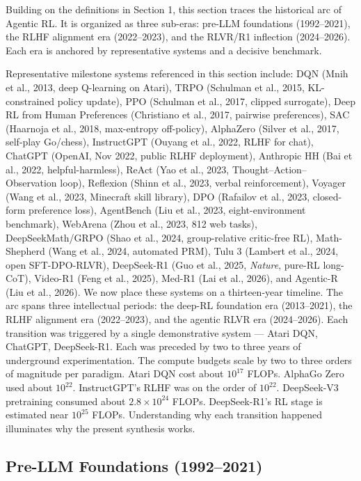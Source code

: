 Building on the definitions in Section 1, this section traces the historical arc of Agentic RL. It is organized as three sub-eras: pre-LLM foundations (1992--2021), the RLHF alignment era (2022--2023), and the RLVR/R1 inflection (2024--2026). Each era is anchored by representative systems and a decisive benchmark.

Representative milestone systems referenced in this section include: DQN (Mnih et al., 2013, deep Q-learning on Atari), TRPO (Schulman et al., 2015, KL-constrained policy update), PPO (Schulman et al., 2017, clipped surrogate), Deep RL from Human Preferences (Christiano et al., 2017, pairwise preferences), SAC (Haarnoja et al., 2018, max-entropy off-policy), AlphaZero (Silver et al., 2017, self-play Go/chess), InstructGPT (Ouyang et al., 2022, RLHF for chat), ChatGPT (OpenAI, Nov 2022, public RLHF deployment), Anthropic HH (Bai et al., 2022, helpful-harmless), ReAct (Yao et al., 2023, Thought--Action--Observation loop), Reflexion (Shinn et al., 2023, verbal reinforcement), Voyager (Wang et al., 2023, Minecraft skill library), DPO (Rafailov et al., 2023, closed-form preference loss), AgentBench (Liu et al., 2023, eight-environment benchmark), WebArena (Zhou et al., 2023, 812 web tasks), DeepSeekMath/GRPO (Shao et al., 2024, group-relative critic-free RL), Math-Shepherd (Wang et al., 2024, automated PRM), Tulu 3 (Lambert et al., 2024, open SFT-DPO-RLVR), DeepSeek-R1 (Guo et al., 2025, \emph{Nature}, pure-RL long-CoT), Video-R1 (Feng et al., 2025), Med-R1 (Lai et al., 2026), and Agentic-R (Liu et al., 2026). We now place these systems on a thirteen-year timeline. The arc spans three intellectual periods: the deep-RL foundation era (2013--2021), the RLHF alignment era (2022--2023), and the agentic RLVR era (2024--2026). Each transition was triggered by a single demonstrative system --- Atari DQN, ChatGPT, DeepSeek-R1. Each was preceded by two to three years of underground experimentation. The compute budgets scale by two to three orders of magnitude per paradigm. Atari DQN cost about \(10^{17}\) FLOPs. AlphaGo Zero used about \(10^{22}\). InstructGPT's RLHF was on the order of \(10^{22}\). DeepSeek-V3 pretraining consumed about \(2.8 \times 10^{24}\) FLOPs. DeepSeek-R1's RL stage is estimated near \(10^{25}\) FLOPs. Understanding why each transition happened illuminates why the present synthesis works.

\subsection{Pre-LLM Foundations (1992--2021)}\label{pre-llm-foundations-19922021}

